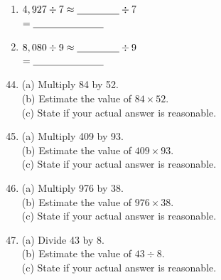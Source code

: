 \documentclass[11pt, a4paper]{article}
\begin{document}
\begin{enumerate}[label=\arabic*.]
    \item $4,927 \div 7 \approx \text{\underline{\hspace{1.5cm}}} \div 7$ \\
    \phantom{$4,927 \div 7$} $= \text{\underline{\hspace{2.5cm}}}$

    \item $8,080 \div 9 \approx \text{\underline{\hspace{1.5cm}}} \div 9$ \\
    \phantom{$8,080 \div 9$} $= \text{\underline{\hspace{2.5cm}}}$
\end{enumerate}

\pagebreak

\begin{enumerate}[label=\arabic*.]
    \setcounter{enumi}{43}
    \item (a) Multiply 84 by 52. \hfill \text{\underline{\hspace{3.5cm}}} \\
          (b) Estimate the value of $84 \times 52$. \hfill \text{\underline{\hspace{3.5cm}}} \\
          (c) State if your actual answer is reasonable. \hfill \text{\underline{\hspace{3.5cm}}}

    \item (a) Multiply 409 by 93. \hfill \text{\underline{\hspace{3.5cm}}} \\
          (b) Estimate the value of $409 \times 93$. \hfill \text{\underline{\hspace{3.5cm}}} \\
          (c) State if your actual answer is reasonable. \hfill \text{\underline{\hspace{3.5cm}}}

    \item (a) Multiply 976 by 38. \hfill \text{\underline{\hspace{3.5cm}}} \\
          (b) Estimate the value of $976 \times 38$. \hfill \text{\underline{\hspace{3.5cm}}} \\
          (c) State if your actual answer is reasonable. \hfill \text{\underline{\hspace{3.5cm}}}

    \item (a) Divide 43 by 8. \hfill \text{\underline{\hspace{3.5cm}}} \\
          (b) Estimate the value of $43 \div 8$. \hfill \text{\underline{\hspace{3.5cm}}} \\
          (c) State if your actual answer is reasonable. \hfill \text{\underline{\hspace{3.5cm}}}


\end{enumerate}
\end{document}
